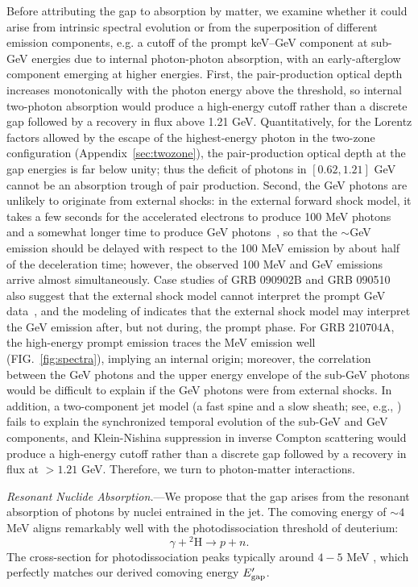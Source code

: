 \documentclass[prd,twocolumn,amsmath,amssymb,aps,linenumbers]{revtex4-2} %
\begin{document}
Before attributing the gap to absorption by matter, we examine whether it could arise from intrinsic spectral evolution or from the superposition of different emission components, e.g. a cutoff of the prompt keV--GeV component at sub-GeV energies due to internal photon-photon absorption, with an early-afterglow component emerging at higher energies.
First, the pair-production optical depth increases monotonically with the photon energy above the threshold, so internal two-photon absorption would produce a high-energy cutoff rather than a discrete gap followed by a recovery in flux above 1.21 GeV. Quantitatively, for the Lorentz factors allowed by the escape of the highest-energy photon in the two-zone configuration (Appendix~\ref{sec:twozone}), the pair-production optical depth at the gap energies is far below unity; thus the deficit of photons in $[0.62, 1.21]$ GeV cannot be an absorption trough of pair production.
Second, the GeV photons are unlikely to originate from external shocks: in the external forward shock model, it takes a few seconds for the accelerated electrons to produce 100 MeV photons and a somewhat longer time to produce GeV photons~\citep{2011MNRAS.412..522B}, so that the $\sim$GeV emission should be delayed with respect to the 100 MeV emission by about half of the deceleration time; however, the observed 100 MeV and GeV emissions arrive almost simultaneously. Case studies of GRB 090902B and GRB 090510 also suggest that the external shock model cannot interpret the prompt GeV data~\citep{2011ApJ...730....1L,2011ApJ...733...22H}, and the modeling of \cite{2011MNRAS.415...77M} indicates that the external shock model may interpret the GeV emission after, but not during, the prompt phase. For GRB 210704A, the high-energy prompt emission traces the MeV emission well (FIG.~\ref{fig:spectra}), implying an internal origin; moreover, the correlation between the GeV photons and the upper energy envelope of the sub-GeV photons would be difficult to explain if the GeV photons were from external shocks.
In addition, a two-component jet model (a fast spine and a slow sheath; see, e.g., \citealt{2025ApJ...995L...2A}) fails to explain the synchronized temporal evolution of the sub-GeV and GeV components, and Klein-Nishina suppression in inverse Compton scattering would produce a high-energy cutoff rather than a discrete gap followed by a recovery in flux at $>1.21$ GeV.
Therefore, we turn to photon-matter interactions.


\textit{Resonant Nuclide Absorption.}---We propose that the gap arises from the resonant absorption of photons by nuclei entrained in the jet. The comoving energy of $\sim 4$ MeV aligns remarkably well with the photodissociation threshold of deuterium:
\begin{equation}
\gamma + {^2\text{H}} \rightarrow p + n.
\end{equation}
The cross-section for photodissociation peaks typically around $4-5$ MeV \cite{IAEA2000}, which perfectly matches our derived comoving energy $E_{\rm gap}^{\prime}$.
\end{document}

